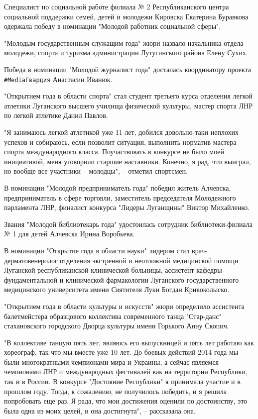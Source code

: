 Специалист по социальной работе филиала № 2 Республиканского центра социальной
поддержки семей, детей и молодежи Кировска Екатерина Буравкова одержала победу
в номинации "Молодой работник социальной сферы".

"Молодым государственным служащим года" жюри назвало начальника отдела
молодежи, спорта и туризма администрации Лутугинского района Елену Сухих.

Победа в номинации "Молодой журналист года" досталась координатору проекта
\verb|#MediaГвардия| Анастасии Иванюк.

"Открытием года в области спорта" стал студент третьего курса отделения легкой
атлетики Луганского высшего училища физической культуры, мастер спорта ЛНР по
легкой атлетике Данил Павлов.

"Я занимаюсь легкой атлетикой уже 11 лет, добился довольно-таки неплохих
успехов и собираюсь, если позволит ситуация, выполнить норматив мастера спорта
международного класса. Поучаствовать в конкурсе не было моей инициативой, меня
уговорили старшие наставники. Конечно, я рад, что выиграл, но вообще все
участники – молодцы", – отметил спортсмен.

В номинации "Молодой предприниматель года" победил житель Алчевска,
предприниматель в сфере торговли, заместитель председателя Молодежного
парламента ЛНР, финалист конкурса "Лидеры Луганщины" Виктор Михайленко.

Звания "Молодой библиотекарь года" удостоилась сотрудник библиотеки-филиала № 1
для детей Алчевска Ирина Воробьева.

В номинации "Открытие года в области науки" лидером стал врач-дерматовенеролог
отделения экстренной и неотложной медицинской помощи Луганской республиканской
клинической больницы, ассистент кафедры фундаментальной и клинической
фармакологии Луганского государственного медицинского университета имени
Святителя Луки Богдан Кривоколыско.

"Открытием года в области культуры и искусств" жюри определило ассистента
балетмейстера образцового коллектива современного танца "Стар-данс"
стахановского городского Дворца культуры имени Горького Анну Скопич.

"В коллективе танцую пять лет, являюсь его выпускницей и пять лет работаю как
хореограф, так что мы вместе уже 10 лет. До боевых действий 2014 года мы были
многократными чемпионами мира и Украины, а сейчас являемся чемпионами ЛНР и
международных фестивалей как на территории Республики, так и в России. В
конкурсе "Достояние Республики" я принимала участие и в прошлом году. Тогда, к
сожалению, не получилось победить, и я решила попробовать еще раз. Я рада, что
мои достижения оценили по достоинству, это была одна из моих целей, и она
достигнута", – рассказала она.

